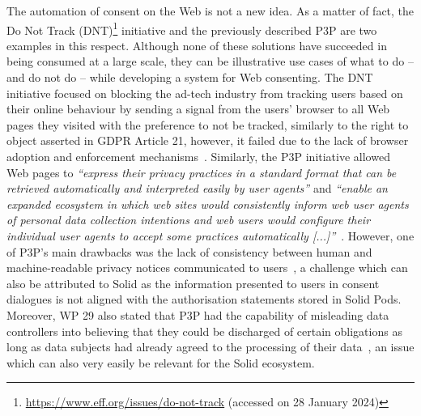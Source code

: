 The automation of consent on the Web is not a new idea.
As a matter of fact, the Do Not Track (DNT)\footnote{\url{https://www.eff.org/issues/do-not-track} (accessed on 28 January 2024)} initiative and the previously described P3P are two examples in this respect.
Although none of these solutions have succeeded in being consumed at a large scale, they can be illustrative use cases of what to do -- and do not do -- while developing a system for Web consenting. 
The DNT initiative focused on blocking the ad-tech industry from tracking users based on their online behaviour by sending a signal from the users' browser to all Web pages they visited with the preference to not be tracked, similarly to the right to object asserted in GDPR Article 21, however, it failed due to the lack of browser adoption and enforcement mechanisms~\citep{kamara_not_2016}.
Similarly, the P3P initiative allowed Web pages to \textit{``express their privacy practices in a standard format that can be retrieved automatically and interpreted easily by user agents''} and \textit{``enable an expanded ecosystem in which web sites would consistently inform web user agents of personal data collection intentions and web users would configure their individual user agents to accept some practices automatically [...]''}~\citep{cranor_platform_2002}.
However, one of P3P's main drawbacks was the lack of consistency between human and machine-readable privacy notices communicated to users~\citep{cranor_web_2002}, a challenge which can also be attributed to Solid as the information presented to users in consent dialogues is not aligned with the authorisation statements stored in Solid Pods.
Moreover, WP 29 also stated that P3P had the capability of misleading data controllers into believing that they could be discharged of certain obligations as long as data subjects had already agreed to the processing of their data~\citep{article_29_data_protection_working_party_article_2014}, an issue which can also very easily be relevant for the Solid ecosystem.

